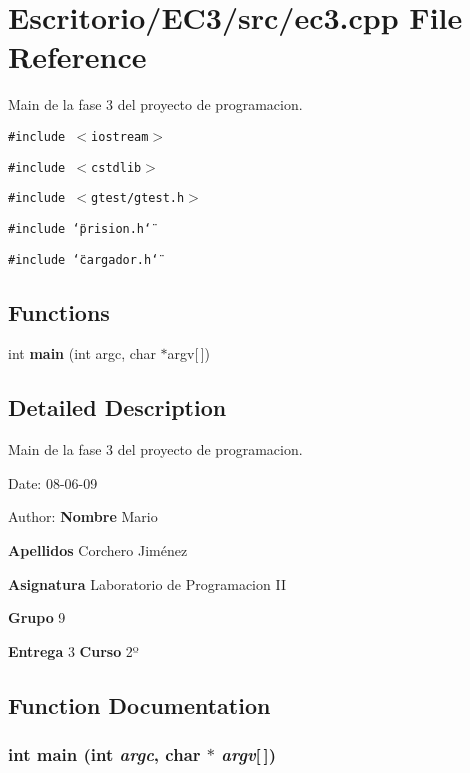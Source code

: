 \section{Escritorio/EC3/src/ec3.cpp File Reference}
\label{ec3_8cpp}
Main de la fase 3 del proyecto de programacion. 

{\tt \#include $<$iostream$>$}\par
{\tt \#include $<$cstdlib$>$}\par
{\tt \#include $<$gtest/gtest.h$>$}\par
{\tt \#include \char`\"{}prision.h\char`\"{}}\par
{\tt \#include \char`\"{}cargador.h\char`\"{}}\par
\subsection*{Functions}
\begin{CompactItemize}
\item 
int {\bf main} (int argc, char $\ast$argv[$\,$])
\end{CompactItemize}


\subsection{Detailed Description}
Main de la fase 3 del proyecto de programacion. 

\begin{Desc}
\item[Date:]08-06-09 \end{Desc}
\begin{Desc}
\item[Author:]{\bf Nombre} Mario \par
 {\bf Apellidos} Corchero Jiménez \par
 {\bf Asignatura} Laboratorio de Programacion II \par
 {\bf Grupo} 9 \par
 {\bf Entrega} 3 {\bf Curso} 2º \end{Desc}


\subsection{Function Documentation}
\subsubsection{\setlength{\rightskip}{0pt plus 5cm}int main (int {\em argc}, char $\ast$ {\em argv}[$\,$])}\label{ec3_8cpp_28052c36c3b61c6c0eaa18f5d226118f}


